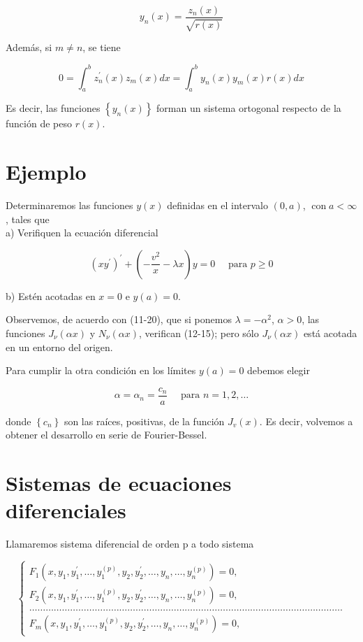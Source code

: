 \documentclass[10pt]{article}
\theoremstyle{plain}
\theoremstyle{definition}
\theoremstyle{remark}
\begin{document}
\begin{equation*}
y_{n}(x)=\frac{z_{n}(x)}{\sqrt{r(x)}} \tag{12-10}
\end{equation*}


Además, si $m \neq n$, se tiene

$$
0=\int_{a}^{b} z_{n}^{\prime}(x) z_{m}(x) d x=\int_{a}^{b} y_{n}(x) y_{m}(x) r(x) d x
$$

Es decir, las funciones $\left\{y_{n}(x)\right\}$ forman un sistema ortogonal respecto de la función de peso $r(x)$.

\section*{Ejemplo}
Determinaremos las funciones $y(x)$ definidas en el intervalo $(0, a)$, $\operatorname{con} a<\infty$, tales que\\
a) Verifiquen la ecuación diferencial


\begin{equation*}
\left(x y^{\prime}\right)^{\prime}+\left(-\frac{v^{2}}{x}-\lambda x\right) y=0 \quad \text { para } p \geqslant 0 \tag{12-16}
\end{equation*}


b) Estén acotadas en $x=0$ e $y(a)=0$.

Observemos, de acuerdo con (11-20), que si ponemos $\lambda=-\alpha^{2}$, $\alpha>0$, las funciones $J_{\nu}(\alpha x)$ y $N_{\nu}(\alpha x)$, verifican (12-15); pero sólo $J_{\nu}(\alpha x)$ está acotada en un entorno del origen.

Para cumplir la otra condición en los límites $y(a)=0$ debemos elegir

$$
\alpha=\alpha_{n}=\frac{c_{n}}{a} \quad \text { para } n=1,2, \ldots
$$

donde $\left\{c_{n}\right\}$ son las raíces, positivas, de la función $J_{v}(x)$. Es decir, volvemos a obtener el desarrollo en serie de Fourier-Bessel.

\section{Sistemas de ecuaciones diferenciales}
Llamaremos sistema diferencial de orden p a todo sistema

\[
\left\{\begin{array}{l}
F_{1}\left(x, y_{1}, y_{1}^{\prime}, \ldots, y_{1}^{(p)}, y_{2}, y_{2}^{\prime}, \ldots, y_{n}, \ldots, y_{n}^{(p)}\right)=0,  \tag{13-1}\\
F_{2}\left(x, y_{1}, y_{1}^{\prime}, \ldots, y_{1}^{(p)}, y_{2}, y_{2}^{\prime}, \ldots, y_{n}, \ldots, y_{n}^{(p)}\right)=0, \\
\ldots \ldots \ldots \ldots \ldots \ldots \ldots \ldots \ldots \ldots \ldots \ldots \ldots \ldots \ldots \ldots \ldots \ldots \ldots \ldots \ldots \ldots \ldots \ldots \ldots \ldots \ldots \ldots \ldots \ldots \ldots \ldots \ldots \ldots \ldots \ldots \ldots \ldots . \\
F_{m}\left(x, y_{1}, y_{1}^{\prime}, \ldots, y_{1}^{(p)}, y_{2}, y_{2}^{\prime}, \ldots, y_{n}, \ldots, y_{n}^{(p)}\right)=0,
\end{array}\right.
\]
\end{document}
